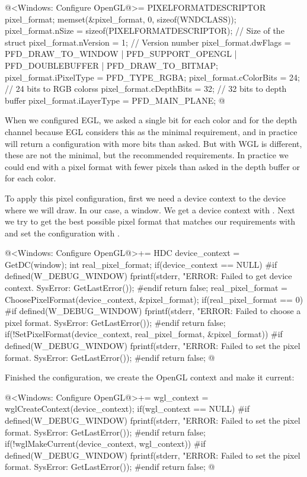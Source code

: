 \iniciocodigo
@<Windows: Configure OpenGL@>=
PIXELFORMATDESCRIPTOR pixel_format;
memset(&pixel_format, 0, sizeof(WNDCLASS));
pixel_format.nSize = sizeof(PIXELFORMATDESCRIPTOR); // Size of the struct
pixel_format.nVersion = 1; // Version number
pixel_format.dwFlags = PFD_DRAW_TO_WINDOW | PFD_SUPPORT_OPENGL |
                       PFD_DOUBLEBUFFER | PFD_DRAW_TO_BITMAP;
pixel_format.iPixelType = PFD_TYPE_RGBA;
pixel_format.cColorBits = 24; // 24 bits to RGB colorss
pixel_format.cDepthBits = 32; // 32 bits to depth buffer
pixel_format.iLayerType = PFD_MAIN_PLANE;
@
\fimcodigo

When we configured EGL, we asked a single bit for each color and for
the depth channel because EGL considers this as the minimal
requirement, and in practice will return a configuration with more
bits than asked. But with WGL is different, these are not the minimal,
but the recommended requirements. In practice we could end with a
pixel format with fewer pixels than asked in the depth buffer or for
each color.

To apply this pixel configuration, first we need a device context to
the device where we will draw. In our case, a window. We get a device
context with . Next we try to get the best possible
pixel format that matches our requirements
with  and set the configuration with
.

\iniciocodigo
@<Windows: Configure OpenGL@>+=
{
  HDC device_context = GetDC(window);
  int real_pixel_format;
  if(device_context == NULL){
#if defined(W_DEBUG_WINDOW)
    fprintf(stderr, "ERROR: Failed to get device context. SysError: %
            GetLastError());
#endif
    return false;
  }
  real_pixel_format = ChoosePixelFormat(device_context, &pixel_format);
  if(real_pixel_format == 0){
#if defined(W_DEBUG_WINDOW)
    fprintf(stderr, "ERROR: Failed to choose a pixel format. SysError: %
            GetLastError());
#endif
    return false;
  }
  if(!SetPixelFormat(device_context, real_pixel_format, &pixel_format)){
#if defined(W_DEBUG_WINDOW)
    fprintf(stderr, "ERROR: Failed to set the pixel format. SysError: %
            GetLastError());
#endif
    return false;
  }
}
@
\fimcodigo

Finished the configuration, we create the OpenGL context and make it
current:

\iniciocodigo
@<Windows: Configure OpenGL@>+=
wgl_context = wglCreateContext(device_context);
if(wgl_context == NULL){
#if defined(W_DEBUG_WINDOW)
  fprintf(stderr, "ERROR: Failed to set the pixel format. SysError: %
          GetLastError());
#endif
  return false;
}
if(!wglMakeCurrent(device_context, wgl_context)){
#if defined(W_DEBUG_WINDOW)
  fprintf(stderr, "ERROR: Failed to set the pixel format. SysError: %
          GetLastError());
#endif
  return false;
}
@
\fimcodigo


